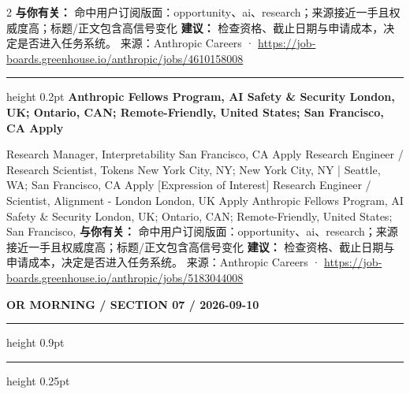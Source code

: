 \documentclass[10.5pt]{ctexart}
\begin{document}
\begin{multicols}{2}
\textbf{与你有关：} 命中用户订阅版面：opportunity、ai、research；来源接近一手且权威度高；标题/正文包含高信号变化
\textbf{建议：} 检查资格、截止日期与申请成本，决定是否进入任务系统。
{\footnotesize\color{ormuted} 来源：Anthropic Careers · \url{https://job-boards.greenhouse.io/anthropic/jobs/4610158008}}
\vspace{2mm}
\hrule height 0.2pt
\vspace{2mm}
{\large\bfseries Anthropic Fellows Program, AI Safety \& Security London, UK; Ontario, CAN; Remote-Friendly, United States; San Francisco, CA Apply}\par
[Expression of Interest] Research Manager, Interpretability San Francisco, CA Apply Research Engineer / Research Scientist, Tokens New York City, NY; New York City, NY | Seattle, WA; San Francisco, CA Apply [Expression of Interest] Research Engineer / Scientist, Alignment - London London, UK Apply Anthropic Fellows Program, AI Safety \& Security London, UK; Ontario, CAN; Remote-Friendly, United States; San Francisco, 
\textbf{与你有关：} 命中用户订阅版面：opportunity、ai、research；来源接近一手且权威度高；标题/正文包含高信号变化
\textbf{建议：} 检查资格、截止日期与申请成本，决定是否进入任务系统。
{\footnotesize\color{ormuted} 来源：Anthropic Careers · \url{https://job-boards.greenhouse.io/anthropic/jobs/5183044008}}
\end{multicols}
\newpage
{\small\bfseries OR MORNING / SECTION 07 / 2026-09-10}
\vspace{2mm}
\hrule height 0.9pt
\vspace{1.5mm}
\hrule height 0.25pt
\vspace{4mm}
\end{document}
